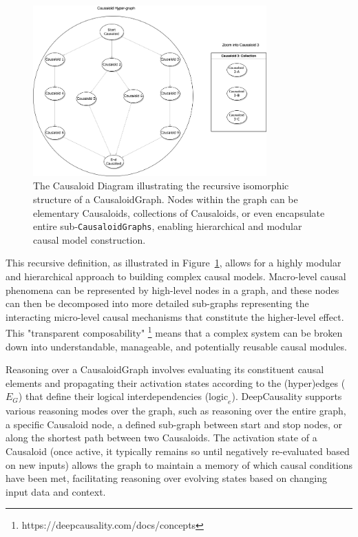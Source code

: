 \begin{figure}[H] %
    \centering
    \includegraphics[width=0.8\textwidth]{img/causaloid.png} %
    \caption{The Causaloid Diagram illustrating the recursive isomorphic structure of a CausaloidGraph. Nodes within the graph can be elementary Causaloids, collections of Causaloids, or even encapsulate entire sub-\texttt{CausaloidGraphs}, enabling hierarchical and modular causal model construction. }
    \label{fig:causaloid_diagram}
\end{figure}

This recursive definition, as illustrated in Figure~\ref{fig:causaloid_diagram}, allows for a highly modular and hierarchical approach to building complex causal models. Macro-level causal phenomena can be represented by high-level nodes in a graph, and these nodes can then be decomposed into more detailed sub-graphs representing the interacting micro-level causal mechanisms that constitute the higher-level effect. This "transparent composability" \footnote{https://deepcausality.com/docs/concepts} means that a complex system can be broken down into understandable, manageable, and potentially reusable causal modules.

\newpage

Reasoning over a CausaloidGraph involves evaluating its constituent causal elements and propagating their activation states according to the (hyper)edges ($E_G$) that define their logical interdependencies ($\text{logic}_e$). DeepCausality supports various reasoning modes over the graph, such as reasoning over the entire graph, a specific Causaloid node, a defined sub-graph between start and stop nodes, or along the shortest path between two Causaloids. The activation state of a Causaloid (once active, it typically remains so until negatively re-evaluated based on new inputs) allows the graph to maintain a memory of which causal conditions have been met, facilitating reasoning over evolving states based on changing input data and context.

